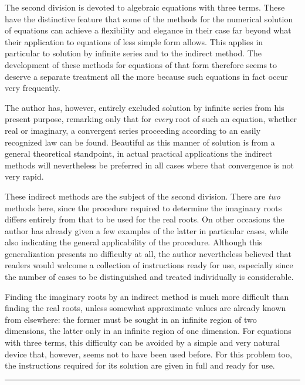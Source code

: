 The second division is devoted to algebraic equations with three terms. These have the distinctive feature that some of the methods for the numerical solution of equations can achieve a flexibility and elegance in their case far beyond what their application to equations of less simple form allows. This applies in particular to solution
by infinite series and to the indirect method. The development of these methods for equations of that form therefore seems to deserve a separate treatment all the more because such equations in fact occur very frequently.

The author has, however, entirely excluded solution by infinite series from his present purpose, remarking only that for \textit{every} root of such an equation, whether real or imaginary, a convergent series proceeding according to an easily recognized law can be found. Beautiful as this manner of solution is from a general theoretical standpoint, in actual practical applications the indirect methods will nevertheless be preferred in all cases where that convergence is not very rapid.

These indirect methods are the subject of the second division. There are \textit{two} methods here, since the procedure required to determine the imaginary roots differs entirely from that to be used for the real roots. On other occasions the author has already given a few examples of the latter in particular cases, while also indicating the general applicability of the procedure. Although this generalization presents no difficulty at all, the author nevertheless believed that readers would welcome a collection of instructions ready for use, especially since the number of cases to be distinguished and treated individually is considerable.

Finding the imaginary roots by an indirect method is much more difficult than finding the real roots, unless somewhat approximate values are already known from elsewhere: the former must be sought in an infinite region of two dimensions, the latter only in an infinite region of one dimension. For equations with three terms, this difficulty can be avoided by a simple and very natural device that, however, seems not to have been used before. For this problem too, the instructions required for its solution are given in full and ready for use.
\par\noindent\hfill\rule{0.30\linewidth}{0.4pt}\hfill\mbox{}\par

